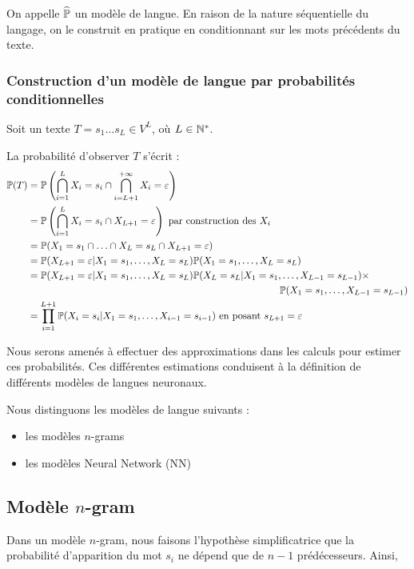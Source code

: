 On appelle $\widehat{\P}$ un modèle de langue. En raison de la nature séquentielle du langage, on le construit en pratique en conditionnant sur les mots précédents du texte.


\subsubsection{Construction d'un modèle de langue par probabilités conditionnelles}
Soit un texte $T=s_1\ldots s_L \in V^L$, où $L \in\N^*$. 

La probabilité d'observer $T$ s'écrit :
\begin{align*}
  \P(T) &= \P\left(\bigcap_{i=1}^L X_i=s_i \cap \bigcap_{i=L+1}^{+\infty} X_i = \varepsilon\right) \\
  &= \P\left(\bigcap_{i=1}^L X_i=s_i \cap X_{L+1} = \varepsilon  \right) \text{ par construction des } X_i\\
  &= \P(X_1 = s_1 \cap \ldots \cap X_L = s_L \cap X_{L+1} = \varepsilon) \\
  &= \P(X_{L+1}=\varepsilon \vert X_1=s_1,\ldots, X_L=s_L)\P(X_1=s_1,\ldots, X_L=s_L) \\
  &= \P(X_{L+1}=\varepsilon \vert X_1=s_1,\ldots, X_L=s_L)\P(X_L=s_L\vert X_1=s_1,\ldots, X_{L-1}=s_{L-1}) \times \\
  & \hspace{9cm}\P(X_1=s_1 ,\ldots, X_{L-1}=s_{L-1}) \\ 
  &=\prod_{i=1}^{L+1} \P(X_i=s_i \vert X_1=s_1,\ldots, X_{i-1}=s_{i-1}) \text{ en posant } s_{L+1} = \varepsilon
\end{align*}


Nous serons amenés à effectuer des approximations dans les calculs pour estimer ces probabilités. Ces différentes estimations conduisent à la définition de différents modèles de langues neuronaux.

Nous distinguons les modèles de langue suivants :

\begin{itemize}
  \item les modèles $n$-grams
  \item les modèles Neural Network (NN)
\end{itemize}

\subsection{Modèle $n$-gram}
Dans un modèle $n$-gram, nous faisons l'hypothèse simplificatrice que la probabilité d'apparition du mot $s_i$ ne dépend que de $n-1$ prédécesseurs. Ainsi,

